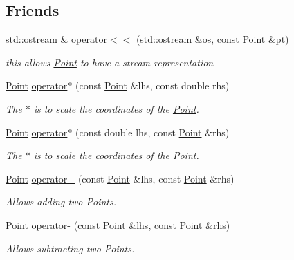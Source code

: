 \subsection*{Friends}
\begin{DoxyCompactItemize}
\item 
std\+::ostream \& \mbox{\hyperlink{class_jinks_draw_1_1_point_a40a2c347e8c84ef40c1a170ab17fec47}{operator$<$$<$}} (std\+::ostream \&os, const \mbox{\hyperlink{class_jinks_draw_1_1_point}{Point}} \&pt)
\begin{DoxyCompactList}\small\item\em this allows \mbox{\hyperlink{class_jinks_draw_1_1_point}{Point}} to have a stream representation \end{DoxyCompactList}\item 
\mbox{\hyperlink{class_jinks_draw_1_1_point}{Point}} \mbox{\hyperlink{class_jinks_draw_1_1_point_a9337a82e2ef8fa00c685b1ea4e6beab4}{operator$\ast$}} (const \mbox{\hyperlink{class_jinks_draw_1_1_point}{Point}} \&lhs, const double rhs)
\begin{DoxyCompactList}\small\item\em The $\ast$ is to scale the coordinates of the \mbox{\hyperlink{class_jinks_draw_1_1_point}{Point}}. \end{DoxyCompactList}\item 
\mbox{\hyperlink{class_jinks_draw_1_1_point}{Point}} \mbox{\hyperlink{class_jinks_draw_1_1_point_a143408ed7b4a531fc9c50620a27076b7}{operator$\ast$}} (const double lhs, const \mbox{\hyperlink{class_jinks_draw_1_1_point}{Point}} \&rhs)
\begin{DoxyCompactList}\small\item\em The $\ast$ is to scale the coordinates of the \mbox{\hyperlink{class_jinks_draw_1_1_point}{Point}}. \end{DoxyCompactList}\item 
\mbox{\hyperlink{class_jinks_draw_1_1_point}{Point}} \mbox{\hyperlink{class_jinks_draw_1_1_point_a607e608ebadca0198af3a6d8a001ec4a}{operator+}} (const \mbox{\hyperlink{class_jinks_draw_1_1_point}{Point}} \&lhs, const \mbox{\hyperlink{class_jinks_draw_1_1_point}{Point}} \&rhs)
\begin{DoxyCompactList}\small\item\em Allows adding two Points. \end{DoxyCompactList}\item 
\mbox{\hyperlink{class_jinks_draw_1_1_point}{Point}} \mbox{\hyperlink{class_jinks_draw_1_1_point_a35071bf200fdd94b49abf93d595b3b24}{operator-\/}} (const \mbox{\hyperlink{class_jinks_draw_1_1_point}{Point}} \&lhs, const \mbox{\hyperlink{class_jinks_draw_1_1_point}{Point}} \&rhs)
\begin{DoxyCompactList}\small\item\em Allows subtracting two Points. \end{DoxyCompactList}\end{DoxyCompactItemize}


